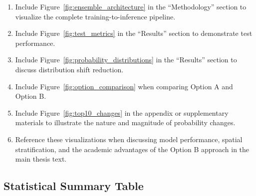 \begin{enumerate}
    \item Include Figure~\ref{fig:ensemble_architecture} in the ``Methodology'' section to
          visualize the complete training-to-inference pipeline.

    \item Include Figure~\ref{fig:test_metrics} in the ``Results'' section to demonstrate
          test performance.

    \item Include Figure~\ref{fig:probability_distributions} in the ``Results'' section to
          discuss distribution shift reduction.

    \item Include Figure~\ref{fig:option_comparison} when comparing Option A and Option B.

    \item Include Figure~\ref{fig:top10_changes} in the appendix or supplementary materials
          to illustrate the nature and magnitude of probability changes.

    \item Reference these visualizations when discussing model performance, spatial stratification,
          and the academic advantages of the Option B approach in the main thesis text.
\end{enumerate}

\subsection{Statistical Summary Table}

